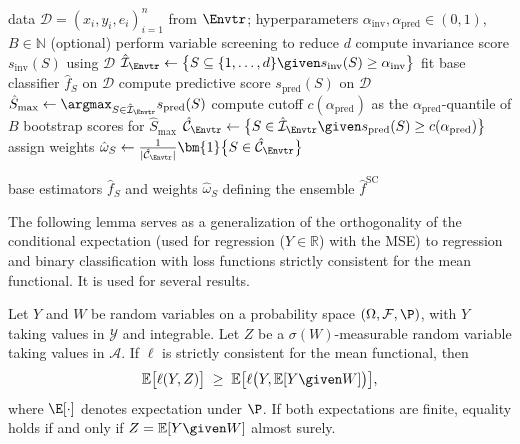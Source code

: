 \begin{algorithm}[t]
\caption{Stabilized classification (SC) \label{alg:SC}}
\begin{algorithmic}[1]
\Require data $\mathcal{D} = (x_i, y_i, e_i)_{i=1}^n$ from $\Envtr$; hyperparameters $\alpha_\mathrm{inv}, \alpha_\mathrm{pred} \in (0,1)$, $B \in \mathbb{N}$
\State (optional) perform variable screening to reduce $d$ \label{line:var_screening}
    \State compute invariance score $s_\mathrm{inv}(S)$ using $\mathcal{D}$
\EndFor
\State $\hat{\mathcal{I}}_{\Envtr} \gets \big\{S \subseteq \{1, \ldots, d\} \given s_\mathrm{inv}(S) \geq \alpha_\mathrm{inv} \big\}$ 
    \State fit base classifier $\hat{f}_S$ on $\mathcal{D}$
    \State compute predictive score $s_\mathrm{pred}(S)$ on $\mathcal{D}$
\EndFor
\State $\hat{S}_\mathrm{max} \gets \argmax_{S \in \hat{\mathcal{I}}_{\Envtr}} s_\mathrm{pred}(S)$
\State compute cutoff $c(\alpha_\mathrm{pred})$ as the $\alpha_\mathrm{pred}$-quantile of $B$ bootstrap scores for $\hat{S}_\mathrm{max}$
\State $\hat{\mathcal{C}}_{\Envtr} \gets \big\{S \in \hat{\mathcal{I}}_{\Envtr} \given s_\mathrm{pred}(S) \geq c(\alpha_\mathrm{pred}) \big\}$ 
\State assign weights $\hat{\omega}_S \gets \frac{1}{|\hat{\mathcal{C}}_{\Envtr}|} \bm{1}\big\{S \in \hat{\mathcal{C}}_{\Envtr} \big\}$
\item[\textbf{Output:}] base estimators $\hat{f}_S$ and weights $\hat{\omega}_S$ defining the ensemble $\hat{f}^{\mathrm{SC}}$
\end{algorithmic}
\end{algorithm}










\label{app:proofs}

The following lemma serves as a generalization of the orthogonality of the conditional expectation (used for regression ($Y \in \mathbb{R}$) with the MSE) to regression and binary classification with loss functions strictly consistent for the mean functional. It is used for several results.

\begin{lemma}
\label{lem:bayes_restricted}
Let $Y$ and $W$ be random variables on a probability space
$(\Omega, \mathcal{F}, \P)$, with $Y$ taking values in $\mathcal{Y}$
and integrable.
Let $Z$ be a $\sigma(W)$-measurable random variable
taking values in $\mathcal{A}$. If $\ell$ is strictly consistent for the mean
functional, then
\begin{equation*}
  \mathbb{E}\bigl[\ell(Y,Z)\bigr]
  \;\geq\;
  \mathbb{E}\bigl[\ell\bigl(Y,\mathbb{E}[Y\given W]\bigr)\bigr],
\end{equation*}
where $\E[\cdot]$ denotes expectation under $\P$.
If both expectations are finite, equality holds if and only if
$Z=\mathbb{E}[Y\given W]$ almost surely.
\end{lemma}

